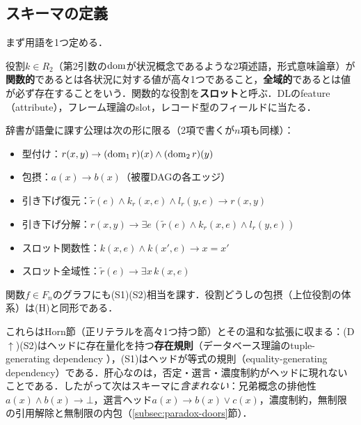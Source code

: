 \documentclass[../../main-detail.tex]{subfiles}
\begin{document}
\subsection{スキーマの定義}
まず用語を1つ定める．
\begin{definition}[スロット]
    役割$k \in R_2$（第2引数の$\mathop{\mathrm{dom}}\nolimits$が状況概念であるような2項述語，形式意味論章）が\textbf{関数的}であるとは各状況に対する値が高々1つであること，\textbf{全域的}であるとは値が必ず存在することをいう．関数的な役割を\textbf{スロット}と呼ぶ．DLのfeature（attribute），フレーム理論のslot，レコード型のフィールドに当たる．
\end{definition}
\begin{definition}[辞書公理スキーマ]
    辞書が語彙に課す公理は次の形に限る（2項で書くが$n$項も同様）：
    \begin{itemize}
        \item[(T)] 型付け：$r(x, y) \to (\mathop{\mathrm{dom}}\nolimits_1 r)(x) \land (\mathop{\mathrm{dom}}\nolimits_2 r)(y)$
        \item[(H)] 包摂：$a(x) \to b(x)$（被覆DAGの各エッジ）
        \item[(D$\downarrow$)] 引き下げ復元：$\tilde r(e) \land k_r(x,e) \land l_r(y,e) \to r(x,y)$
        \item[(D$\uparrow$)] 引き下げ分解：$r(x,y) \to \exists e\,(\tilde r(e) \land k_r(x,e) \land l_r(y,e))$
        \item[(S1)] スロット関数性：$k(x,e) \land k(x',e) \to x = x'$
        \item[(S2)] スロット全域性：$\tilde r(e) \to \exists x\, k(x,e)$
    \end{itemize}
    関数$f \in F_n$のグラフにも(S1)(S2)相当を課す．役割どうしの包摂（上位役割の体系）は(H)と同形である．
\end{definition}
これらはHorn節（正リテラルを高々1つ持つ節）とその温和な拡張に収まる：(D$\uparrow$)(S2)はヘッドに存在量化を持つ\textbf{存在規則}（データベース理論のtuple-generating dependency \cite{data-exchange}），(S1)はヘッドが等式の規則（equality-generating dependency）である．肝心なのは，否定・選言・濃度制約がヘッドに現れないことである．したがって次はスキーマに\emph{含まれない}：兄弟概念の排他性$a(x) \land b(x) \to \bot$，選言ヘッド$a(x) \to b(x) \lor c(x)$，濃度制約，無制限の引用解除と無制限の内包（\ref{subsec:paradox-doors}節）．
\end{document}
